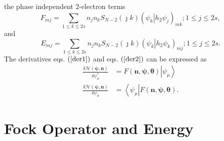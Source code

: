 \documentclass[aps,preprint]{revtex4}%
\begin{document}
the phase independent $2$-electron terms
\begin{equation}
F_{mj}=\sum_{1\leq k\leq2s}n_{j}n_{k}S_{N-2}\left(  \jmath k\right)  \left(
\left.  \psi_{k}\right\vert h_{2}\psi_{j}\right)  _{mk};1\leq j\leq2s,
\end{equation}
and%
\begin{equation}
E_{mj}=\sum_{1\leq k\leq2s}n_{j}n_{k}S_{N-2}\left(  \jmath k\right)  \left(
\left.  \psi_{k}\right\vert h_{2}\psi_{k}\right)  _{mj};1\leq j\leq2s.
\end{equation}
The derivatives eqs. $\left(  \ref{der1}\right)  $ and eqs. $\left(
\ref{der2}\right)  $ can be expressed as
\begin{align}
\frac{\delta\mathcal{H}\left(  \mathbf{\psi,n}\right)  }{\delta\psi_{\mu
}^{\ast}}  &  =F\left(  \mathbf{n},\mathbf{\psi},\mathbf{\theta}\right)
\left\vert \psi_{\mu}\right\rangle \\
\frac{\delta\mathcal{H}\left(  \mathbf{\psi,n}\right)  }{\delta\psi_{\mu}}  &
=\left\langle \psi_{\mu}\right\vert F\left(  \mathbf{n},\mathbf{\psi
},\mathbf{\theta}\right)  .
\end{align}


\section{Fock Operator and Energy}%
\end{document}
